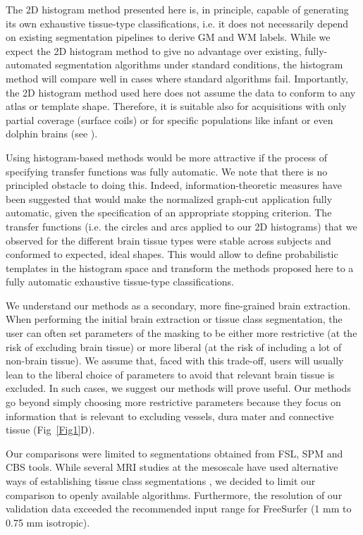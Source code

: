 The 2D histogram method presented here is, in principle, capable of generating its own exhaustive tissue-type classifications, i.e. it does not necessarily depend on existing segmentation pipelines to derive GM and WM labels. While we expect the 2D histogram method to give no advantage over existing, fully-automated segmentation algorithms under standard conditions, the histogram method will compare well in cases where standard algorithms fail. Importantly, the 2D histogram method used here does not assume the data to conform to any atlas or template shape. Therefore, it is suitable also for acquisitions with only partial coverage (surface coils) or for specific populations like infant or even dolphin brains (see ).

Using histogram-based methods would be more attractive if the process of specifying transfer functions was fully automatic. We note that there is no principled obstacle to doing this. Indeed, information-theoretic measures have been suggested \cite{Ip2012} that would make the normalized graph-cut application fully automatic, given the specification of an appropriate stopping criterion. The transfer functions (i.e. the circles and arcs applied to our 2D histograms) that we observed for the different brain tissue types were stable across subjects and conformed to expected, ideal shapes. This would allow to define probabilistic templates in the histogram space and transform the methods proposed here to a fully automatic exhaustive tissue-type classifications.

We understand our methods as a secondary, more fine-grained brain extraction. When performing the initial brain extraction or tissue class segmentation, the user can often set parameters of the masking to be either more restrictive (at the risk of excluding brain tissue) or more liberal (at the risk of including a lot of non-brain tissue). We assume that, faced with this trade-off, users will usually lean to the liberal choice of parameters to avoid that relevant brain tissue is excluded. In such cases, we suggest our methods will prove useful. Our methods go beyond simply choosing more restrictive parameters because they focus on information that is relevant to excluding vessels, dura mater and connective tissue (Fig~\ref{Fig1}D).

Our comparisons were limited to segmentations obtained from FSL, SPM and CBS tools. While several MRI studies at the mesoscale have used alternative ways of establishing tissue class segmentations \cite{Fischl2004, Goebel2006}, we decided to limit our comparison to openly available algorithms. Furthermore, the resolution of our validation data exceeded the recommended input range for FreeSurfer (1 mm to 0.75 mm isotropic).

